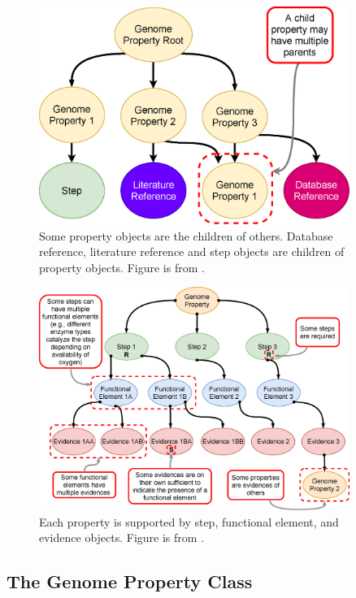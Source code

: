 \begin{figure}[!ht]
  \centering
	\includegraphics[width=0.90\textwidth]{media/Figure_1A.eps}
	 \caption{Some property objects are the children of others. Database reference, literature reference and step objects are children of property objects. Figure is from \cite{bergstrand2019pygenprop}.}
	 \label{fig:propertytree}
\end{figure}

\begin{figure}[!ht]
  \centering
	\includegraphics[width=0.90\textwidth]{media/Figure_1B.eps}
	 \caption{Each property is supported by step, functional element, and evidence objects. Figure is from \cite{bergstrand2019pygenprop}.}
	 \label{fig:property}
\end{figure}

\subsection{The Genome Property Class}

